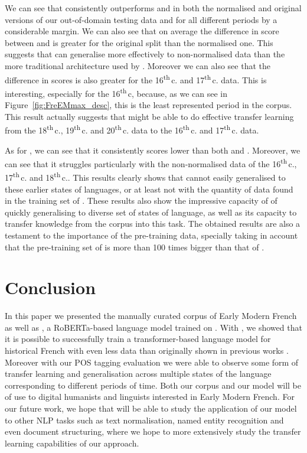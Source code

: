 We can see that \dalembert consistently outperforms \pieextended and \camembert in both the normalised and original versions of our out-of-domain testing data and for all different periods by a considerable margin. We can also see that on average the difference in score between \dalembert and \pieextended is greater for the original split than the normalised one. This suggests that \dalembert can generalise more effectively to non-normalised data than the more traditional architecture used by \pieextended. Moreover we can also see that the difference in scores is also greater for the 16\textsuperscript{th}\,c. and 17\textsuperscript{th}\,c. data. This is interesting, especially for the 16\textsuperscript{th}\,c, because, as we can see in Figure~\ref{fig:FreEMmax_desc}, this is the least represented period in the \freemmax corpus. This result actually suggests that \dalembert might be able to do effective transfer learning from the 18\textsuperscript{th}\,c., 19\textsuperscript{th}\,c. and 20\textsuperscript{th}\,c. data to the 16\textsuperscript{th}\,c. and 17\textsuperscript{th}\,c. data.

As for \camembert, we can see that it consistently scores lower than both \dalembert and \pieextended. Moreover, we can see that it struggles particularly with the non-normalised data of the 16\textsuperscript{th}\,c., 17\textsuperscript{th}\,c. and 18\textsuperscript{th}\,c.. This results clearly shows that \camembert cannot easily generalised to these earlier states of languages, or at least not with the quantity of data found in the training set of \freemlpm. These results also show the impressive capacity of \dalembert of quickly generalising to diverse set of states of language, as well as its capacity to transfer knowledge from the \freemmax corpus into this task. The obtained results are also a testament to the importance of the pre-training data, specially taking in account that the pre-training set of \camembert is more than 100 times bigger than that of \dalembert.

\section{Conclusion}

In this paper we presented the manually curated \freemmax corpus of Early Modern French as well as \dalembert, a RoBERTa-based language model trained on \freemmax. With \dalembert, we showed that it is possible to successfully train a transformer-based language model for historical French with even less data than originally shown in previous works \cite{martin-etal-2020-camembert}. Moreover with our POS tagging evaluation we were able to observe some form of transfer learning and generalisation across multiple states of the language corresponding to different periods of time. Both our corpus and our model will be of use to digital humanists and linguists interested in Early Modern French. For our future work, we hope that will be able to study the application of our \dalembert model to other NLP tasks such as text normalisation, named entity recognition and even document structuring, where we hope to more extensively study the transfer learning capabilities of our approach.

